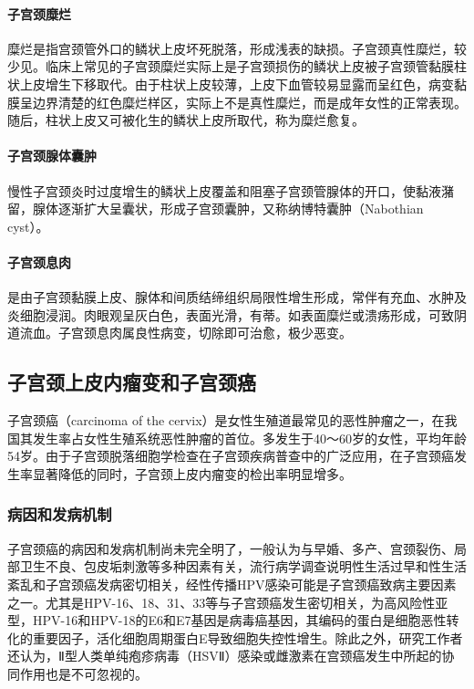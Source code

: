 \paragraph{子宫颈糜烂}
糜烂是指宫颈管外口的鳞状上皮坏死脱落，形成浅表的缺损。子宫颈真性糜烂，较少见。临床上常见的子宫颈糜烂实际上是子宫颈损伤的鳞状上皮被子宫颈管黏膜柱状上皮增生下移取代。由于柱状上皮较薄，上皮下血管较易显露而呈红色，病变黏膜呈边界清楚的红色糜烂样区，实际上不是真性糜烂，而是成年女性的正常表现。随后，柱状上皮又可被化生的鳞状上皮所取代，称为糜烂愈复。

\paragraph{子宫颈腺体囊肿}
慢性子宫颈炎时过度增生的鳞状上皮覆盖和阻塞子宫颈管腺体的开口，使黏液潴留，腺体逐渐扩大呈囊状，形成子宫颈囊肿，又称纳博特囊肿（Nabothian
cyst）。

\paragraph{子宫颈息肉}
是由子宫颈黏膜上皮、腺体和间质结缔组织局限性增生形成，常伴有充血、水肿及炎细胞浸润。肉眼观呈灰白色，表面光滑，有蒂。如表面糜烂或溃疡形成，可致阴道流血。子宫颈息肉属良性病变，切除即可治愈，极少恶变。

\subsection{子宫颈上皮内瘤变和子宫颈癌}

子宫颈癌（carcinoma of the
cervix）是女性生殖道最常见的恶性肿瘤之一，在我国其发生率占女性生殖系统恶性肿瘤的首位。多发生于40～60岁的女性，平均年龄54岁。由于子宫颈脱落细胞学检查在子宫颈疾病普查中的广泛应用，在子宫颈癌发生率显著降低的同时，子宫颈上皮内瘤变的检出率明显增多。

\subsubsection{病因和发病机制}

子宫颈癌的病因和发病机制尚未完全明了，一般认为与早婚、多产、宫颈裂伤、局部卫生不良、包皮垢刺激等多种因素有关，流行病学调查说明性生活过早和性生活紊乱和子宫颈癌发病密切相关，经性传播HPV感染可能是子宫颈癌致病主要因素之一。尤其是HPV-16、18、31、33等与子宫颈癌发生密切相关，为高风险性亚型，HPV-16和HPV-18的E6和E7基因是病毒癌基因，其编码的蛋白是细胞恶性转化的重要因子，活化细胞周期蛋白E导致细胞失控性增生。除此之外，研究工作者还认为，Ⅱ型人类单纯疱疹病毒（HSVⅡ）感染或雌激素在宫颈癌发生中所起的协同作用也是不可忽视的。


